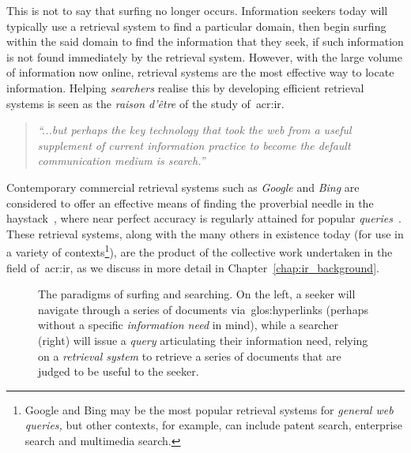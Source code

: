 This is not to say that surfing no longer occurs. Information seekers today will typically use a retrieval system to find a particular domain, then begin surfing within the said domain to find the information that they seek, if such information is not found immediately by the retrieval system. However, with the large volume of information now online, retrieval systems are the most effective way to locate information. Helping \emph{searchers} realise this by developing efficient retrieval systems is seen as the \emph{raison d'\^{e}tre} of the study of~\gls{acr:ir}.

\begin{quote}
    \emph{``...but perhaps the key technology that took the web from a useful supplement of current information practice to become the default communication medium is search.''}
\end{quote}

Contemporary commercial retrieval systems such as \emph{Google} and \emph{Bing} are considered to offer an effective means of finding the proverbial needle in the haystack~\citep{wilson2010keyword_search}, where near perfect accuracy is regularly attained for popular \emph{queries}~\citep{vaughan2004new_measurements}. These retrieval systems, along with the many others in existence today (for use in a variety of contexts\footnote{Google and Bing may be the most popular retrieval systems for \emph{general web queries,} but other contexts, for example, can include patent search, enterprise search and multimedia search.}), are the product of the collective work undertaken in the field of~\gls{acr:ir}, as we discuss in more detail in Chapter~\ref{chap:ir_background}.

\begin{figure}[t!]
    \centering
    \caption[Surfing vs. searching: illustrations of the two paradigms]{The paradigms of surfing and searching. On the left, a seeker will navigate through a series of documents via~\glspl{glos:hyperlink} (perhaps without a specific \emph{information need} in mind), while a searcher (right) will issue a \emph{query} articulating their information need, relying on a \emph{retrieval system} to retrieve a series of documents that are judged to be useful to the seeker.}
    \label{fig:ch1-surfing}
\end{figure}

